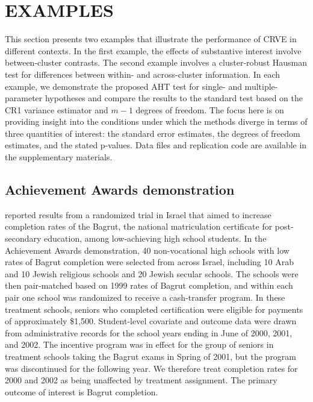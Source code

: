 \documentclass[12pt]{article}\usepackage[]{graphicx}\usepackage[]{color}
\begin{document}
\section{EXAMPLES}
\label{sec:examples}

This section presents two examples that illustrate the performance of CRVE in different contexts. 
In the first example, the effects of substantive interest involve between-cluster contrasts. 
The second example involves a cluster-robust Hausman test for differences between within- and across-cluster information. 
In each example, we demonstrate the proposed AHT test for single- and multiple-parameter hypotheses and compare the results to the standard test based on the CR1 variance estimator and $m - 1$ degrees of freedom. 
The focus here is on providing insight into the conditions under which the methods diverge in terms of three quantities of interest: the standard error estimates, the degrees of freedom estimates, and the stated p-values. 
Data files and replication code are available in the supplementary materials.

\subsection{Achievement Awards demonstration} 

\citet{Angrist2009effects} reported results from a randomized trial in Israel that aimed to increase completion rates of the Bagrut, the national matriculation certificate for post-secondary education, among low-achieving high school students. 
In the Achievement Awards demonstration, 40 non-vocational high schools with low rates of Bagrut completion were selected from across Israel, including 10 Arab and 10 Jewish religious schools and 20 Jewish secular schools. 
The schools were then pair-matched based on 1999 rates of Bagrut completion, and within each pair one school was randomized to receive a cash-transfer program. 
In these treatment schools, seniors who completed certification were eligible for payments of approximately \$1,500. 
Student-level covariate and outcome data were drawn from administrative records for the school years ending in June of 2000, 2001, and 2002. 
The incentive program was in effect for the group of seniors in treatment schools taking the Bagrut exams in Spring of 2001, but the program was discontinued for the following year. 
We therefore treat completion rates for 2000 and 2002 as being unaffected by treatment assignment.
The primary outcome of interest is Bagrut completion. 
\end{document}
